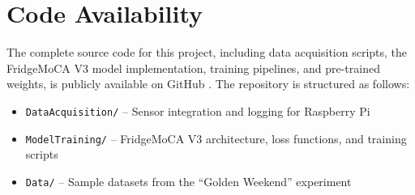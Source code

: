 \documentclass[conference]{IEEEtran}
\begin{document}
    \section*{Code Availability}

    The complete source code for this project, including data acquisition scripts, the FridgeMoCA V3 model implementation, training pipelines, and pre-trained weights, is publicly available on GitHub \cite{enose-repo}. The repository is structured as follows:

    \begin{itemize}
        \item \texttt{DataAcquisition/} -- Sensor integration and logging for Raspberry Pi
        \item \texttt{ModelTraining/} -- FridgeMoCA V3 architecture, loss functions, and training scripts
        \item \texttt{Data/} -- Sample datasets from the ``Golden Weekend'' experiment
    \end{itemize}

    \printbibliography
\end{document}
